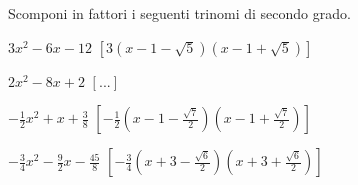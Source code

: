 \begin{esercizio}[\Ast]
 \label{ese:3.87}
Scomponi in fattori i seguenti trinomi di secondo grado.
\begin{enumeratea}
\item$3 x^{2}-6 x-12$ 
 \hfill$\left[3 \left(x-1-\sqrt{5} \right) 
         \left(x-1 + \sqrt{5} \right)\right]$
\item$2 x^{2}-8 x + 2$ 
 \hfill$\left[...\right]$
\item$- \frac{1}{2} x^{2} + x + \frac{3}{8}$ 
 \hfill$\left[- \frac{1}{2} \left(x-1-\frac{\sqrt{7}}{2} \right) 
         \left(x- 1 + \frac{\sqrt{7}}{2} \right)\right]$
\item$- \frac{3}{4} x^{2}-\frac{9}{2} x - \frac{45}{8}$ 
 \hfill$\left[- \frac{3}{4} \left(x + 3-\frac{\sqrt{6}}{2} \right) 
         \left(x+ 3 + \frac{\sqrt{6}}{2} \right)\right]$
\end{enumeratea}
\end{esercizio}

